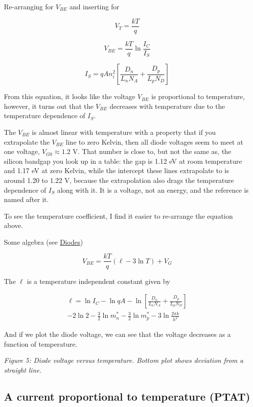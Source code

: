 Re-arranging for \(V_{BE}\) and inserting for

\[V_T = \frac{kT}{q}\]

\[ V_{BE} = \frac{k T}{q} \ln{\frac{I_C}{I_S}}\]

\[I_S = q A n_i^2 \left[\frac{D_n}{L_n N_A} + \frac{D_p}{L_p N_D}\right]\]

From this equation, it looks like the voltage \(V_{BE}\) is proportional
to temperature, however, it turns out that the \(V_{BE}\) decreases with
temperature due to the temperature dependence of \(I_S\).

The \(V_{BE}\) is almost linear with temperature with a property that if
you extrapolate the \(V_{BE}\) line to zero Kelvin, then all diode
voltages seem to meet at one voltage, \(V_{G0} \approx 1.2\) V. That
number is close to, but not the same as, the silicon bandgap you look up
in a table: the gap is 1.12 eV at room temperature and 1.17 eV at zero
Kelvin, while the intercept these lines extrapolate to is around 1.20 to
1.22 V, because the extrapolation also drags the temperature dependence
of \(I_S\) along with it. It is a voltage, not an energy, and the
reference is named after it.

To see the temperature coefficient, I find it easier to re-arrange the
equation above.

Some algebra (see \href{https://analogicus.com/aic2026/diodes}{Diodes})

\[ V_{BE} = \frac{kT}{q}(\ell  - 3 \ln T) + V_G \]

The \(\ell\) is a temperature independent constant given by

\[ 
 \begin{split}
 \ell= \ln{I_C} - 
 \ln{qA} - \ln{\left[\frac{D_n}{L_n N_A} + \frac{D_p}{L_p N_D}\right]}
 \\ - 2 \ln{2}
  - \frac{3}{2} \ln{m_n^*} - \frac{3}{2}\ln{m_p^*}
 - 3 \ln{\frac{2 \pi k}{h^2}} 
 \end{split}
 \]

And if we plot the diode voltage, we can see that the voltage decreases
as a function of temperature.


{
\centering
{}
}

\emph{Figure 5: Diode voltage versus temperature. Bottom plot shows
deviation from a straight line. }

\subsection{A current proportional to temperature
(PTAT)}\label{a-current-proportional-to-temperature-ptat}

